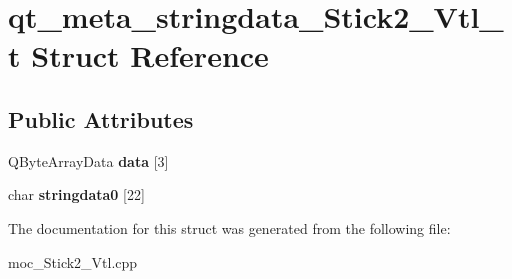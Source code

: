\hypertarget{structqt__meta__stringdata__Stick2__Vtl__t}{}\section{qt\+\_\+meta\+\_\+stringdata\+\_\+\+Stick2\+\_\+\+Vtl\+\_\+t Struct Reference}
\label{structqt__meta__stringdata__Stick2__Vtl__t}
\subsection*{Public Attributes}
\begin{DoxyCompactItemize}
\item 
Q\+Byte\+Array\+Data {\bfseries data} \mbox{[}3\mbox{]}\hypertarget{structqt__meta__stringdata__Stick2__Vtl__t_a14d8f8a2cfd9980075debad72724fc96}{}\label{structqt__meta__stringdata__Stick2__Vtl__t_a14d8f8a2cfd9980075debad72724fc96}

\item 
char {\bfseries stringdata0} \mbox{[}22\mbox{]}\hypertarget{structqt__meta__stringdata__Stick2__Vtl__t_aa7b8dbb1987547b5d4668ecf019b6c1e}{}\label{structqt__meta__stringdata__Stick2__Vtl__t_aa7b8dbb1987547b5d4668ecf019b6c1e}

\end{DoxyCompactItemize}


The documentation for this struct was generated from the following file\+:\begin{DoxyCompactItemize}
\item 
moc\+\_\+\+Stick2\+\_\+\+Vtl.\+cpp\end{DoxyCompactItemize}

